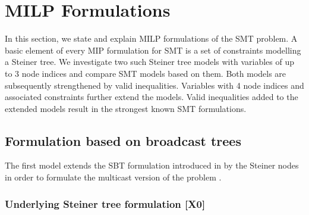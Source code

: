 \section{MILP Formulations}
\label{sec:ILP}

In this section, we state and explain MILP formulations of the SMT problem.
A basic element of every MIP formulation for SMT is a set of constraints modelling a Steiner tree.
We investigate two such Steiner tree models with variables of up to 3 node indices and compare SMT models based on them.
Both models are subsequently strengthened by valid inequalities.
Variables with 4 node indices and associated constraints further extend the models.
Valid inequalities added to the extended models result in the strongest known SMT formulations.

\subsection{Formulation based on broadcast trees}

The first model extends the SBT formulation introduced in \cite{Haugland12Dual} by the Steiner nodes in order to formulate the multicast version of the problem \cite{ivanova16isco}.

\subsubsection{Underlying Steiner tree formulation [X0]}

